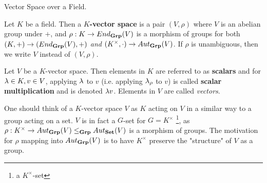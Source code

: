 \documentclass[../book.tex]{subfiles}
\begin{document}
\begin{dfn} Vector Space over a Field. 

    Let $K$ be a field. 
    Then a \textbf{$K$-vector space} is a pair $(V,\rho)$
    where $V$ is an abelian group under $+$, 
    and $\rho : K \to End_{\mathbf{Grp}}(V)$ is a morphism of groups for both
    $(K,+) \to (End_{\mathbf{Grp}}(V),+)$ \emph{and} 
    $(K^\times,\cdot) \to Aut_{\mathbf{Grp}}(V)$.
    If $\rho$ is unambiguous, then we write $V$ instead of $(V,\rho)$. 
    
    Let $V$ be a $K$-vector space. 
    Then elements in $K$ are referred to as \textbf{scalars}
    and for $\lambda \in K, v \in V$, applying $\lambda$ to $v$ 
    (i.e. applying $\lambda_\rho$ to $v$) is called
    \textbf{scalar multiplication} and is denoted $\lambda v$. 
    Elements in $V$ are called \emph{vectors}. 

\end{dfn}

\begin{rmk}
    One should think of a $K$-vector space $V$ as $K$ acting on $V$
    in a similar way to a group acting on a set. 
    $V$ is in fact a $G$-set for $G=K^\times$
    \footnote{a $K^\times$-set}, 
    as $\rho : K^\times \to Aut_{\mathbf{Grp}}(V) \leq_{\mathbf{Grp}} Aut_{\mathbf{Set}}(V)$
    is a morphism of groups. 
    The motivation for $\rho$ mapping into $Aut_{\mathbf{Grp}}(V)$ is
    to have $K^\times$ preserve the "structure" of $V$ as a group. 
    
\end{rmk}

\end{document}
